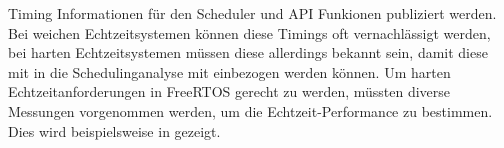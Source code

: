 Timing Informationen für den Scheduler und API Funkionen publiziert werden. Bei weichen Echtzeitsystemen können diese Timings oft vernachlässigt werden, bei harten Echtzeitsystemen müssen diese allerdings bekannt sein, damit diese mit in die Schedulinganalyse mit einbezogen werden können. Um harten Echtzeitanforderungen in FreeRTOS gerecht zu werden, müssten diverse Messungen vorgenommen werden, um die Echtzeit-Performance zu bestimmen. Dies wird beispielsweise in\cite{RealTimePerformance} gezeigt.     